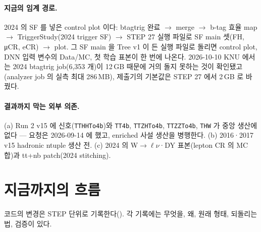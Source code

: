 \paragraph{지금의 임계 경로.} 2024 의 SF 를 넣은 control plot 이다: btagtrig 완료 $\to$ merge $\to$ b-tag 효율 map $\to$ TriggerStudy(2024 trigger SF)
$\to$ STEP 27 실행 파일로 SF main 셋(FH, μCR, eCR) $\to$ plot. 그 SF main 을 Tree v1 이 든 실행 파일로 돌리면
control plot, DNN 입력 변수의 Data/MC, 첫 학습 표본이 한 번에 나온다. 2026-10-10 KNU 에서는 2024 btagtrig job(6,353 개)이
 12\,GB 때문에 거의 돌지 못하는 것이 확인됐고(analyzer job 의 실측 최대 286\,MB), 제출기의 기본값은 STEP 27 에서
2\,GB 로 바꿨다.

\paragraph{결과까지 막는 외부 의존.} (a) Run 2 v15 에 신호(\texttt{TTHHTo4b})와 \texttt{TT4b}, \texttt{TTZHTo4b}, \texttt{TTZZTo4b}, \texttt{THW} 가
중앙 생산에 없다 — 요청은 2026-09-14 에 했고, enriched 사설 생산을 병행한다. (b) 2016·2017 v15 hadronic ntuple 생산 전. (c) 2024 의
W$\to\ell\nu$·DY 표본(lepton CR 의 MC 합)과 tt+nb patch(2024 stitching).

\section{지금까지의 흐름}\label{sec:status-history}

코드의 변경은 STEP 단위로 기록한다(). 각 기록에는 무엇을, 왜, 원래 형태, 되돌리는 법, 검증이 있다.

